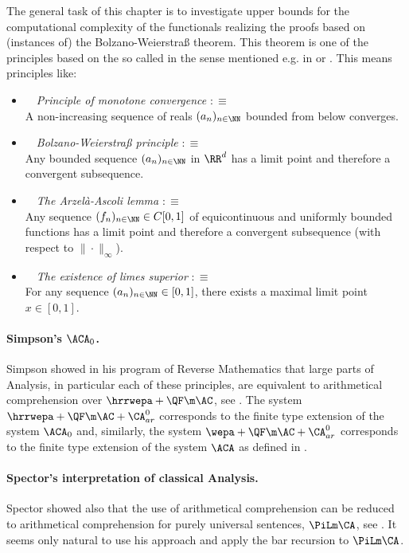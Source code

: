 The general task of this chapter is to investigate upper bounds for the computational complexity of the
functionals realizing the proofs based on (instances of) the Bolzano-Weierstra{\ss} theorem.
This theorem is one of the principles based on the so called 
in the sense mentioned e.g. in \cite{KO02} or \cite{Kohlenbach98}.
This means principles like:
\begin{itemize}
\item  {}\ \ \emph{Principle of monotone convergence} $:\equiv$\\
        A non-increasing sequence of reals $(a_n)_{n\in\NN}$ bounded
        from below converges.
%      
\item  {}\ \ \emph{Bolzano-Weierstra{\ss} principle} $:\equiv$\\
  Any bounded sequence $(a_n)_{n\in\NN}$ in $\RR^d$ has a limit point and 
therefore a convergent subsequence.
%
\item {}\ \ \emph{The Arzel\`{a}-Ascoli lemma} $:\equiv$\\
  Any sequence $(f_n)_{n\in\NN}\in C[0,1]$ of equicontinuous and uniformly bounded functions 
  has a limit point and therefore a convergent subsequence (with respect to $\|\cdot\|_\infty$).
% 
\item {}\ \ \emph{The existence of limes superior} $:\equiv$\\
For any sequence $(a_n)_{n\in\NN}\in[0,1]$, there exists a maximal limit point $x\in[0,1]$.
%
\end{itemize}
%
%
\paragraph{Simpson's $\ACA_0$.}
Simpson showed in his 
program of Reverse Mathematics that large parts of Analysis, in particular each of these principles,
 are equivalent to arithmetical comprehension over $\hrrwepa+\QF\m\AC$, see \cite{Simpson99}.
The system  $\hrrwepa+\QF\m\AC+\CA^0_{ar}$ corresponds to the finite type extension 
of the system $\ACA_0$ and, similarly, the system $\wepa+\QF\m\AC+\CA^0_{ar}$
corresponds to the finite type extension 
of the system $\ACA$ as defined in \cite{Simpson99}.
%
\paragraph{Spector's interpretation of classical Analysis.}
Spector showed also that the use 
of arithmetical comprehension can be reduced
to arithmetical comprehension for purely universal sentences, $\PiLm\CA$, see \cite{Spector62}. 
It seems only natural to use his
approach and apply the
bar recursion to $\PiLm\CA$.
%
